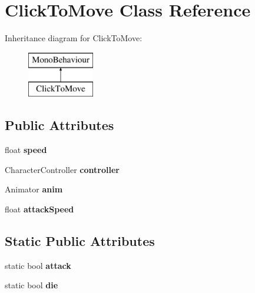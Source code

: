 \hypertarget{class_click_to_move}{}\section{Click\+To\+Move Class Reference}
\label{class_click_to_move}
Inheritance diagram for Click\+To\+Move\+:\begin{figure}[H]
\begin{center}
\leavevmode
\includegraphics[height=2.000000cm]{class_click_to_move}
\end{center}
\end{figure}
\subsection*{Public Attributes}
\begin{DoxyCompactItemize}
\item 
\mbox{\label{class_click_to_move_aac470519ddd58c7abd2483189fad68a1}} 
float {\bfseries speed}
\item 
\mbox{\label{class_click_to_move_a994f7ef477344b83f88a2e3f6cc851d7}} 
Character\+Controller {\bfseries controller}
\item 
\mbox{\label{class_click_to_move_ac94045aa2258a65663f2a808253d5aa5}} 
Animator {\bfseries anim}
\item 
\mbox{\label{class_click_to_move_ad66cd916848620bfecd80b52c4a9511a}} 
float {\bfseries attack\+Speed}
\end{DoxyCompactItemize}
\subsection*{Static Public Attributes}
\begin{DoxyCompactItemize}
\item 
\mbox{\label{class_click_to_move_a1c210864eeb2d4b60b6ca933b0aa6b2d}} 
static bool {\bfseries attack}
\item 
\mbox{\label{class_click_to_move_a263b8d7596f06f4c3cfa4219f1c728cc}} 
static bool {\bfseries die}
\end{DoxyCompactItemize}
